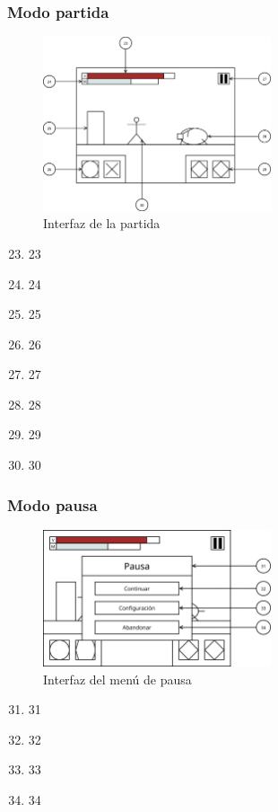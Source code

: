 \subsubsection{Modo partida}
\begin{figure}[H]
    \centering
    \includegraphics[width=0.6\textwidth]{5-Cuerpo/Chapter5/I6.png} %
    \caption{Interfaz de la partida}
    \label{fig:Interface_Partida}
\end{figure}
\begin{enumerate}\setcounter{enumi}{22}
    \item 23
    \item 24
    \item 25
    \item 26
    \item 27
    \item 28
    \item 29
    \item 30
\end{enumerate}

\subsubsection{Modo pausa}
\begin{figure}[H]
    \centering
    \includegraphics[width=0.6\textwidth]{5-Cuerpo/Chapter5/I7.png} %
    \caption{Interfaz del menú de pausa}
    \label{fig:Interface_Pausa}
\end{figure}
\begin{enumerate}\setcounter{enumi}{30}
    \item 31
    \item 32
    \item 33
    \item 34
\end{enumerate}

